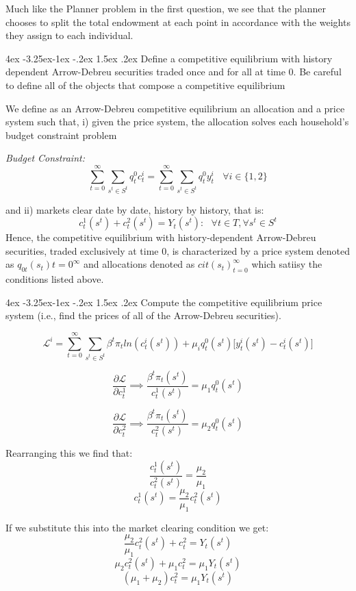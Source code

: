 \documentclass[10pt]{article}
\makeatletter
\newcommand{\bb}{\bigbreak\noindent}
\renewcommand\subsection{\leftskip 4ex\@startsection{subsection}{2}{\z@}%
	{-3.25ex\@plus -1ex \@minus -.2ex}%
	{1.5ex \@plus .2ex}%
	{\normalfont\large\bfseries}}
\makeatother
\begin{document}
\begin{spacing}{1.5}
Much like the Planner problem in the first question, we see that the planner chooses to split the total endowment at each point in accordance with the weights they assign to each individual.

\subsection{Define a competitive equilibrium with history dependent Arrow-Debreu securities traded once and for all at time 0. Be careful to define all of the objects that compose a competitive equilibrium}

We define as an Arrow-Debreu competitive equilibrium an allocation and a price system such that, i) given the price system, the allocation solves each household's budget constraint problem 

\textit{Budget Constraint:}
\[ \sum_{t=0}^{\infty}\sum_{s^t \in S^t} q^0_t  c^i_t =  \sum_{t=0}^{\infty}\sum_{s^t \in S^t} q^0_t y^i_t \:\:\:\: \forall i \in \{1,2\} \]
 
\bb
and ii) markets clear date by date, history by history, that is:
\[ c^1_t(s^t)+c^2_t(s^t)= Y_t(s^t) :\:\:\: \forall t \in T, \forall s^t \in S^t \]
\bb
Hence, the competitive equilibrium with history-dependent Arrow-Debreu securities, traded exclusively at time 0, is characterized by a price system denoted as \( {q_{0t}(s_t)}{t=0}^{\infty} \) and allocations denoted as \( {c{it}(s_t)}_{t=0}^{\infty} \) which satiisy the conditions listed above.


\subsection{Compute the competitive equilibrium price system (i.e., find the prices of all of the Arrow-Debreu securities).}

\[ \mathcal{L}^i = \sum_{t=0}^{\infty} \sum_{s^t \in S^t} \beta^t \pi_t ln(c^i_t(s^t)) + \mu_i q^0_t(s^t) \big[y^i_t(s^t) - c^i_t(s^t)\big]   \]

\[ \frac{\partial \mathcal{L}}{\partial{c_t^1}} \implies  \frac{\beta^t \pi_t(s^t)}{c^1_t(s^t)} = \mu_1 q^0_t(s^t) \]

\[ \frac{\partial \mathcal{L}}{\partial{c_t^2}} \implies  \frac{\beta^t \pi_t(s^t)}{c^2_t(s^t)}= \mu_2 q^0_t(s^t) \]

Rearranging this we find that: 
\[ \frac{c^1_t(s^t)}{c^2_t(s^t)} = \frac{\mu_2}{\mu_1} \]
\[ c^1_t(s^t) = \frac{\mu_2}{\mu_1}c^2_t(s^t) \]

If we substitute this into the market clearing condition we get:
\[ \frac{\mu_2}{\mu_1}c^2_t(s^t) + c^2_t = Y_t(s^t) \]
\[ \mu_2 c^2_t(s^t) + \mu_1c^2_t = \mu_1Y_t(s^t) \]
\[ (\mu_1+\mu_2 )c^2_t = \mu_1Y_t(s^t) \]


\end{spacing}
\end{document}
